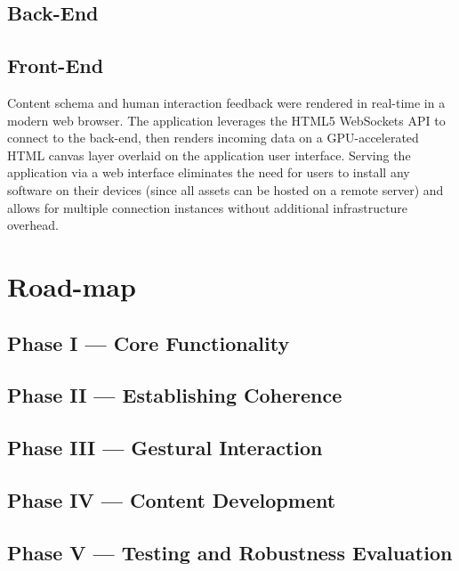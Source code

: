 \documentclass{scrartcl}
\begin{document}
    \subsection{Back-End}
    \subsection{Front-End}
      Content schema and human interaction feedback were rendered in real-time in a modern web browser. The application leverages the HTML5 WebSockets API to connect to the back-end, then renders incoming data on a GPU-accelerated HTML canvas layer overlaid on the application user interface. Serving the application via a web interface eliminates the need for users to install any software on their devices (since all assets can be hosted on a remote server) and allows for multiple connection instances without additional infrastructure overhead.

  \section{Road-map}
    \subsection{Phase I --- Core Functionality}
    \subsection{Phase II --- Establishing Coherence}
    \subsection{Phase III --- Gestural Interaction}
    \subsection{Phase IV --- Content Development}
    \subsection{Phase V --- Testing and Robustness Evaluation}
\end{document}
